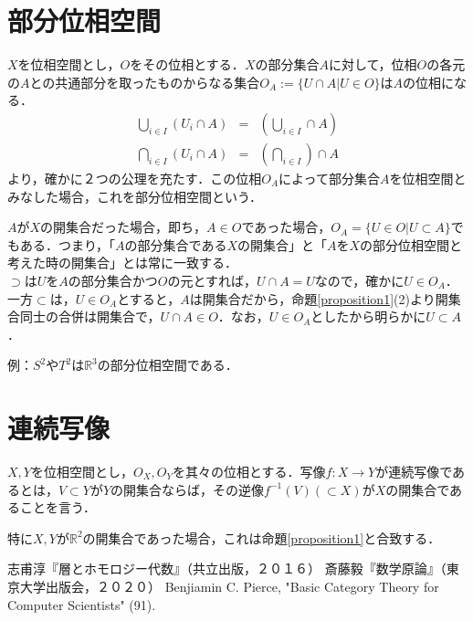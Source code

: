 \documentclass[uplatex, dvipdfmx]{jsreport}
\begin{document}
\section{部分位相空間}
$X$を位相空間とし，$O$をその位相とする．$X$の部分集合$A$に対して，位相$O$の各元の$A$との共通部分を取ったものからなる集合$O_A:=\{ U\cap A | U\in O \}$は$A$の位相になる．
\begin{eqnarray*}
    \bigcup_{i\in I}(U_i\cap A) &=& (\bigcup_{i\in I} \cap A) \\
    \bigcap_{i\in I}(U_i\cap A) &=& (\bigcap_{i\in I}) \cap A 
\end{eqnarray*}
より，確かに２つの公理を充たす．この位相$O_A$によって部分集合$A$を位相空間とみなした場合，これを部分位相空間という．\par

$A$が$X$の開集合だった場合，即ち，$A\in O$であった場合，$O_A=\{U\in O | U\subset A \}$でもある．つまり，「$A$の部分集合である$X$の開集合」と「$A$を$X$の部分位相空間と考えた時の開集合」とは常に一致する．\\
$\supset$は$U$を$A$の部分集合かつ$O$の元とすれば，$U\cap A=U$なので，確かに$U\in O_A$．一方$\subset$は，$U\in O_A$とすると，$A$は開集合だから，命題\ref{proposition1}(2)より開集合同士の合併は開集合で，$U\cap A \in O$．なお，$U\in O_A$としたから明らかに$U\subset A$．

例：$S^2やT^2$は$\mathbb{R}^3$の部分位相空間である．\\

\section{連続写像}

\begin{shadebox}\begin{definition}[連続写像]
    $X,Y$を位相空間とし，$O_X,O_Y$を其々の位相とする．写像$f:X\rightarrow Y$が連続写像であるとは，$V\subset Y$が$Y$の開集合ならば，その逆像$f^{-1}(V)(\subset X)$が$X$の開集合であることを言う．
\end{definition}\end{shadebox}
特に$X,Y$が$\mathbb{R}^2$の開集合であった場合，これは命題\ref{proposition1}と合致する．

\begin{thebibliography}{9}
        志甫淳『層とホモロジー代数』（共立出版，２０１６）
        斎藤毅『数学原論』（東京大学出版会，２０２０）
    Benjiamin C. Pierce, "Basic Category Theory for Computer Scientists" (91).
\end{thebibliography}
\end{document}
